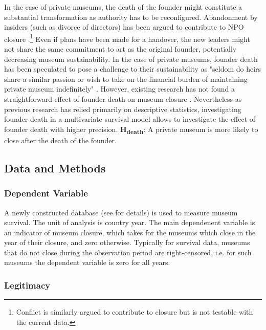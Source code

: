 \documentclass[11pt]{article}
\begin{document}
In the case of private museums, the death of the founder might constitute a substantial transformation as authority has to be reconfigured.
Abandonment by insiders (such as divorce of directors) has been argued to contribute to NPO closure \parencite{Duckles_Hager_Galaskiewicz_2005_close}.\footnote{Conflict is similarly argued to contribute to closure but is not testable with the current data.}
Even if plans have been made for a handover, the new leaders might not share the same commitment to art as the original founder, potentially decreasing museum sustainability. 
In the case of private museums, founder death has been speculated to pose a challenge to their sustainability as "seldom do heirs share a similar passion or wish to take on the financial burden of maintaining private museum indefinitely" \parencite[p.234]{Walker_2019_collector}.
However, existing research has not found a straightforward effect of founder death on museum closure \parencite{Velthuis_Gera_forthcoming_fragility,Velthuis_etal_2023_boom}.
Nevertheless as previous research has relied primarily on descriptive statistics, investigating founder death in a multivariate survival model allows to investigate the effect of founder death with higher precision.
\bigbreak
\noindent
\textbf{H\textsubscript{death}}: A private museum is more likely to close after the death of the founder.





\subsection*{Data and Methods}


\subsubsection*{Dependent Variable}

A newly constructed database (see \textcite{Velthuis_etal_2023_boom} for details) is used to measure museum survival.
The unit of analysis is country year.
The main dependenent variable is an indicator of museum closure, which takes for the museums which close in the year of their closure, and zero otherwise.
Typically for survival data, museums that do not close during the observation period are right-censored, i.e. for such museums the dependent variable is zero for all years.

\subsubsection*{Legitimacy}
\end{document}

